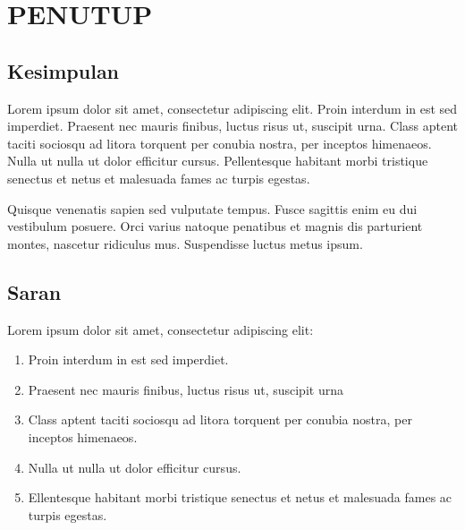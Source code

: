 \chapter{PENUTUP}

\section{Kesimpulan}

Lorem ipsum dolor sit amet, consectetur adipiscing elit. Proin interdum in est sed imperdiet. Praesent nec mauris finibus, luctus risus ut, suscipit urna. Class aptent taciti sociosqu ad litora torquent per conubia nostra, per inceptos himenaeos. Nulla ut nulla ut dolor efficitur cursus. Pellentesque habitant morbi tristique senectus et netus et malesuada fames ac turpis egestas.

Quisque venenatis sapien sed vulputate tempus. Fusce sagittis enim eu dui vestibulum posuere. Orci varius natoque penatibus et magnis dis parturient montes, nascetur ridiculus mus. Suspendisse luctus metus ipsum.


\section{Saran}

Lorem ipsum dolor sit amet, consectetur adipiscing elit:
\begin{enumerate}
    \item Proin interdum in est sed imperdiet.
    \item Praesent nec mauris finibus, luctus risus ut, suscipit urna
    \item Class aptent taciti sociosqu ad litora torquent per conubia nostra, per inceptos himenaeos.
    \item Nulla ut nulla ut dolor efficitur cursus.
    \item Ellentesque habitant morbi tristique senectus et netus et malesuada fames ac turpis egestas.
\end{enumerate}